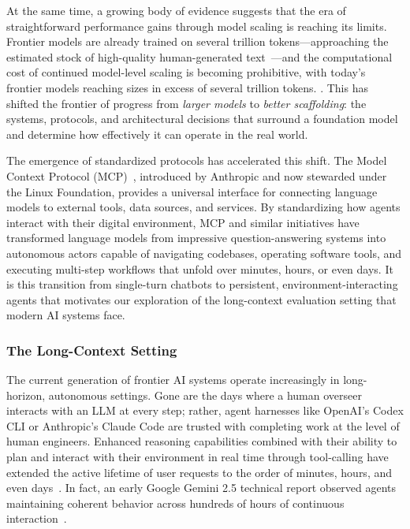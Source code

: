At the same time, a growing body of evidence suggests that the era of straightforward performance gains through model scaling is reaching its limits. Frontier models are already trained on several trillion tokens---approaching the estimated stock of high-quality human-generated text~\citep{villalobos2024run}---and the computational cost of continued model-level scaling is becoming prohibitive, with today's frontier models reaching sizes in excess of several trillion tokens. . This has shifted the frontier of progress from \emph{larger models} to \emph{better scaffolding}: the systems, protocols, and architectural decisions that surround a foundation model and determine how effectively it can operate in the real world.

The emergence of standardized protocols has accelerated this shift. The Model Context Protocol (MCP)~\citep{anthropic2024mcp}, introduced by Anthropic and now stewarded under the Linux Foundation, provides a universal interface for connecting language models to external tools, data sources, and services. By standardizing how agents interact with their digital environment, MCP and similar initiatives have transformed language models from impressive question-answering systems into autonomous actors capable of navigating codebases, operating software tools, and executing multi-step workflows that unfold over minutes, hours, or even days. It is this transition from single-turn chatbots to persistent, environment-interacting agents that motivates our exploration of the long-context evaluation setting that modern AI systems face.

\subsubsection{The Long-Context Setting}\label{sec:long_context}

The current generation of frontier AI systems operate increasingly in long-horizon, autonomous settings. Gone are the days where a human overseer interacts with an LLM at every step; rather, agent harnesses like OpenAI's Codex CLI or Anthropic's Claude Code are trusted with completing work at the level of human engineers. Enhanced reasoning capabilities combined with their ability to plan and interact with their environment in real time through tool-calling have extended the active lifetime of user requests to the order of minutes, hours, and even days~\citep{anthropic2025visible}. In fact, an early Google Gemini 2.5 technical report observed agents maintaining coherent behavior across hundreds of hours of continuous interaction~\citep{gemini2p5report}.

